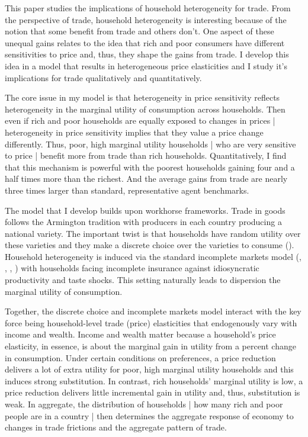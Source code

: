 \documentclass[12pt,pdftex]{article}
\begin{document}
\begin{onehalfspacing}
\hspace{-0.05cm}



\thispagestyle{empty}
\newpage
\normalsize

This paper studies the implications of household heterogeneity for trade. From the perspective of trade, household heterogeneity is interesting because of the notion that some benefit from trade and others don't. One aspect of these unequal gains relates to the idea that rich and poor consumers have different sensitivities to price and, thus, they shape the gains from trade.  I develop this idea in a model that results in heterogeneous price elasticities and I study it's implications for trade qualitatively and quantitatively.

The core issue in my model is that heterogeneity in price sensitivity reflects heterogeneity in the marginal utility of consumption across households. Then even if rich and poor households are equally exposed to changes in prices | heterogeneity in price sensitivity implies that they value a price change differently. Thus, poor, high marginal utility households | who are very sensitive to price | benefit more from trade than rich households. Quantitatively, I find that this mechanism is powerful with the poorest households gaining four and a half times more than the richest. And the average gains from trade are nearly three times larger than standard, representative agent benchmarks.

The model that I develop builds upon workhorse frameworks. Trade in goods follows the Armington tradition with producers in each country producing a national variety. The important twist is that households have random utility over these varieties and they make a discrete choice over the varieties to consume (\citet{mcfadden1974frontiers}).  Household heterogeneity is induced via the standard incomplete markets model (\citet{bewley1979optimum}, \citet{imrohorouglu1989cost}, \citet{huggett1993risk}, \citet{aiyagari1994uninsured}) with households facing incomplete insurance against idiosyncratic productivity and taste shocks. This setting naturally leads to dispersion the marginal utility of consumption.

Together, the discrete choice and incomplete markets model interact with the key force being household-level trade (price) elasticities that endogenously vary with income and wealth. Income and wealth matter because a household's price elasticity, in essence, is about the marginal gain in utility from a percent change in consumption. Under certain conditions on preferences, a price reduction delivers a lot of extra utility for poor, high marginal utility households and this induces strong substitution. In contrast, rich households' marginal utility is low, a price reduction delivers little incremental gain in utility and, thus, substitution is weak. In aggregate, the distribution of households | how many rich and poor people are in a country | then determines the aggregate response of economy to changes in trade frictions and the aggregate pattern of trade.


\end{onehalfspacing}
\end{document}
